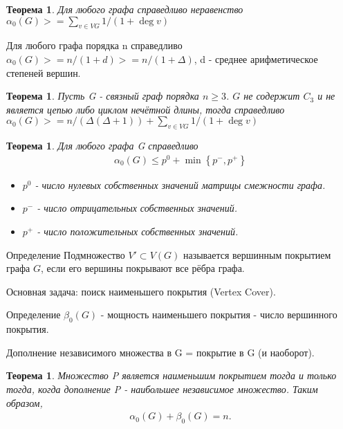 \documentclass[a4paper,openany]{book}
\newcounter{TheoremCounter}
\newtheorem{theorem}[TheoremCounter]{Теорема}
\newenvironment{definition}
{\begin{statement}{Определение}}
    {\end{statement}}
\newenvironment{consequence}{}{}
\newcommand{\set}[1]{
    \left\{ #1 \right\}
}
\begin{document}
\begin{theorem}
  Для любого графа справедливо неравенство
  $\alpha_0(G) >= \sum_{v \in VG}1 / (1 + \deg v)$
\end{theorem}
\begin{consequence}
  Для любого графа порядка n справедливо
  $\alpha_0(G) >= n / (1 + d) >= n / (1 + \Delta)$,
  d - среднее арифметическое степеней вершин.
\end{consequence}

\begin{theorem}
  Пусть G - связный граф порядка $n \geqslant 3$. $G$ не содержит $C_3$ и не
  является цепью либо циклом нечётной длины, тогда справедливо
  $\alpha_0(G) >= n / (\Delta(\Delta + 1)) + \sum_{v \in VG}1 / (1 + \deg v)$
\end{theorem}

\begin{theorem}
  Для любого графа G справедливо
  \begin{align*}
    \alpha_0(G) \leqslant p^0 + \min\set{p^-, p^+}
  \end{align*}
  \begin{itemize}
    \item $p^0$ - число нулевых собственных значений матрицы смежности графа.
    \item $p^-$ - число отрицательных собственных значений.
    \item $p^+$ - число положительных собственных значений.
  \end{itemize}
\end{theorem}

\begin{definition}
  Подмножество $V' \subset V(G)$ называется вершинным покрытием графа $G$, если
  его вершины покрывают все рёбра графа.
\end{definition}
Основная задача: поиск наименьшего покрытия (Vertex Cover).

\begin{definition}
  $\beta_0(G)$ - мощность наименьшего покрытия - число вершинного покрытия.
\end{definition}

Дополнение независимого множества в G = покрытие в G (и наоборот).

\begin{theorem}
  Множество P является наименьшим покрытием тогда и только тогда, когда
  дополнение P - наибольшее независимое множество. Таким образом,
  \begin{align*}
    \alpha_0(G) + \beta_0(G) = n.
  \end{align*}
\end{theorem}
\end{document}

